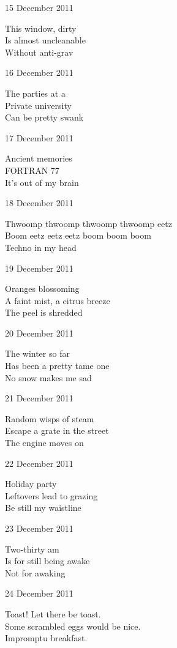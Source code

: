 \documentclass[12pt]{article}
\begin{document}
15 December 2011

This window, dirty \\
Is almost uncleanable \\
Without anti-grav

16 December 2011

The parties at a \\
Private university  \\
Can be pretty swank

17 December 2011

Ancient memories \\
FORTRAN 77 \\
It's out of my brain

\newpage

18 December 2011

Thwoomp thwoomp thwoomp thwoomp eetz \\
Boom eetz eetz eetz boom boom boom \\
Techno in my head

19 December 2011

Oranges blossoming \\
A faint mist, a citrus breeze \\
The peel is shredded

20 December 2011

The winter so far \\
Has been a pretty tame one \\
No snow makes me sad

21 December 2011

Random wisps of steam \\
Escape a grate in the street \\
The engine moves on

22 December 2011

Holiday party \\
Leftovers lead to grazing \\
Be still my waistline

23 December 2011

Two-thirty am \\
Is for still being awake \\
Not for awaking

24 December 2011

Toast! Let there be toast. \\
Some scrambled eggs would be nice. \\
Impromptu breakfast.

\newpage
\end{document}
